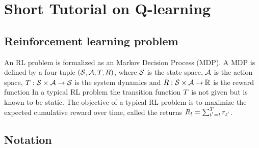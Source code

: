 \section{Short Tutorial on Q-learning}

\subsection{Reinforcement learning problem}

An RL problem is formalized as an Markov Decision Process (MDP). A MDP is
defined by a four tuple $(\mathcal{S}, \mathcal{A}, T, R)$, where $\mathcal{S}$ is the
state space, $\mathcal{A}$ is the action space, $T : \mathcal{S} \times \mathcal{A}
\rightarrow \mathcal{S}$ is the system dynamics and $R : \mathcal{S} \times \mathcal{A}
\rightarrow \mathbb{R} $ is the reward function
In a typical RL problem the transition function $T$ is not given but is
known to be static.
The objective of a typical RL problem is to maximize the expected cumulative
reward over time, called the returns  $R_t = \sum_{t^{'}=t}^{T} r_{t^{'}}$.

\subsection{Notation}

